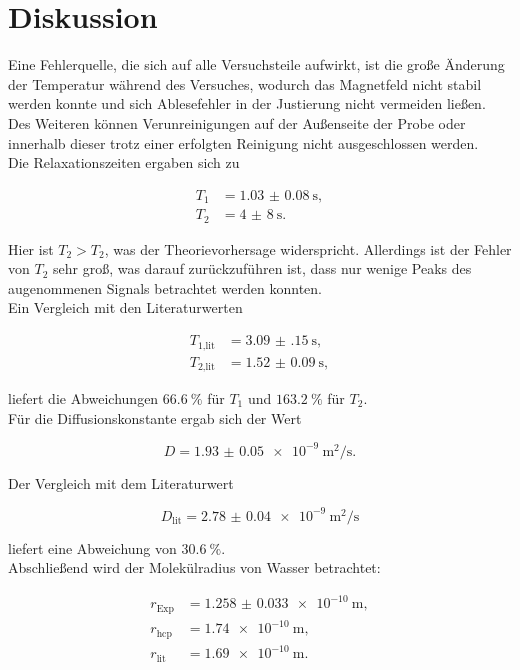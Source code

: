\section{Diskussion}
\label{sec:Diskussion}


Eine Fehlerquelle, die sich auf alle Versuchsteile aufwirkt, ist die große Änderung der Temperatur während des Versuches,
wodurch das Magnetfeld nicht stabil werden konnte und sich Ablesefehler in der Justierung nicht vermeiden ließen. 
Des Weiteren können Verunreinigungen auf der Außenseite der Probe oder innerhalb dieser trotz einer erfolgten Reinigung 
nicht ausgeschlossen werden.\\
Die Relaxationszeiten ergaben sich zu 

\begin{align*}
    T_1 &= \SI{1.03(8)}{\second},\\
    T_2 &= \SI{4(8)}{\second}.
\end{align*}

Hier ist $T_2 > T_2$, was der Theorievorhersage widerspricht. Allerdings ist der Fehler von $T_2$ sehr groß, was darauf 
zurückzuführen ist, dass nur wenige Peaks des augenommenen Signals betrachtet werden konnten. \\
Ein Vergleich mit den Literaturwerten \cite{diff}

\begin{align*}
    T_\text{1,lit} &= \SI{3.09(15)}{\second},\\
    T_\text{2,lit} &= \SI{1.52(9)}{\second},
\end{align*}

liefert die Abweichungen $\SI{66.6}{\percent}$ für $T_1$ und $\SI{163.2}{\percent}$ für $T_2$.\\
Für die Diffusionskonstante ergab sich der Wert 

\begin{equation*}
    D = \SI{1.93(5)e-9}{\metre^2\per\second}.
\end{equation*}

Der Vergleich mit dem Literaturwert \cite{diff}

\begin{equation*}
    D_\text{lit} = \SI{2.78(4)e-9}{\metre^2\per\second}
\end{equation*}

liefert eine Abweichung von $\SI{30.6}{\percent}$.\\
Abschließend wird der Molekülradius von Wasser betrachtet: \cite{radius} 

\begin{align*}
    r_\text{Exp} &= \SI{1.258(33)e-10}{\metre},\\
    r_\text{hcp} &= \SI{1.74e-10}{\metre},\\
    r_\text{lit} &= \SI{1.69e-10}{\metre}.
\end{align*}


